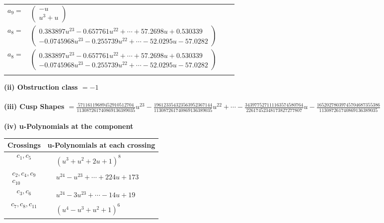\documentclass[1p]{elsarticle_modified}
\theoremstyle{definition}
\begin{document}
\begin{tabular}{m{7pt} m{180pt} m{7pt} m{180pt} }
\flushright $a_{9}=$&$\begin{pmatrix}- u\\u^3+u\end{pmatrix}$ \\
\flushright $a_{8}=$&$\begin{pmatrix}0.383897 u^{23}-0.657761 u^{22}+\cdots+57.2698 u+0.530339\\-0.0745968 u^{23}-0.255739 u^{22}+\cdots-52.0295 u-57.0282\end{pmatrix}$\\ \flushright $a_{8}=$&$\begin{pmatrix}0.383897 u^{23}-0.657761 u^{22}+\cdots+57.2698 u+0.530339\\-0.0745968 u^{23}-0.255739 u^{22}+\cdots-52.0295 u-57.0282\end{pmatrix}$\\&\end{tabular}
\flushleft \textbf{(ii) Obstruction class $= -1$}\\~\\
\flushleft \textbf{(iii) Cusp Shapes $= \frac{57116119689452910512704}{113087261740869136389035} u^{23}-\frac{196123354323563952367144}{113087261740869136389035} u^{22}+\cdots-\frac{343977527111163574580764}{22617452348173827277807} u-\frac{16520278039745704687355386}{113087261740869136389035}$}\\~\\
\newpage\renewcommand{\arraystretch}{1}
\flushleft \textbf{(iv) u-Polynomials at the component}\newline \\
\begin{tabular}{m{50pt}|m{274pt}}
Crossings & \hspace{64pt}u-Polynomials at each crossing \\
\hline $$\begin{aligned}c_{1},c_{5}\end{aligned}$$&$\begin{aligned}
&(u^3+u^2+2 u+1)^8
\end{aligned}$\\
\hline $$\begin{aligned}c_{2},c_{4},c_{9}\\c_{10}\end{aligned}$$&$\begin{aligned}
&u^{24}- u^{23}+\cdots+224 u+173
\end{aligned}$\\
\hline $$\begin{aligned}c_{3},c_{6}\end{aligned}$$&$\begin{aligned}
&u^{24}-3 u^{23}+\cdots-14 u+19
\end{aligned}$\\
\hline $$\begin{aligned}c_{7},c_{8},c_{11}\end{aligned}$$&$\begin{aligned}
&(u^4- u^3+u^2+1)^6
\end{aligned}$\\
\hline
\end{tabular}\\~\\
\end{document}
